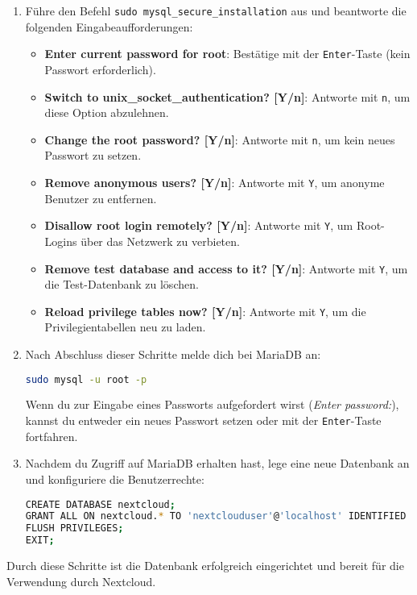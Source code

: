\documentclass[a4paper,12pt]{article}
\begin{document}
\begin{enumerate}
    \item Führe den Befehl \texttt{sudo mysql\_secure\_installation} aus und beantworte die folgenden Eingabeaufforderungen:
    \begin{itemize}
        \item \textbf{Enter current password for root}: Bestätige mit der \texttt{Enter}-Taste (kein Passwort erforderlich).
        \item \textbf{Switch to unix\_socket\_authentication? [Y/n]}: Antworte mit \texttt{n}, um diese Option abzulehnen.
        \item \textbf{Change the root password? [Y/n]}: Antworte mit \texttt{n}, um kein neues Passwort zu setzen.
        \item \textbf{Remove anonymous users? [Y/n]}: Antworte mit \texttt{Y}, um anonyme Benutzer zu entfernen.
        \item \textbf{Disallow root login remotely? [Y/n]}: Antworte mit \texttt{Y}, um Root-Logins über das Netzwerk zu verbieten.
        \item \textbf{Remove test database and access to it? [Y/n]}: Antworte mit \texttt{Y}, um die Test-Datenbank zu löschen.
        \item \textbf{Reload privilege tables now? [Y/n]}: Antworte mit \texttt{Y}, um die Privilegientabellen neu zu laden.
    \end{itemize}
    
    \item Nach Abschluss dieser Schritte melde dich bei MariaDB an:
\begin{lstlisting}[language=bash]
sudo mysql -u root -p
\end{lstlisting}
    Wenn du zur Eingabe eines Passworts aufgefordert wirst (\textit{Enter password:}), kannst du entweder ein neues Passwort setzen oder mit der \texttt{Enter}-Taste fortfahren.
    
    \item Nachdem du Zugriff auf MariaDB erhalten hast, lege eine neue Datenbank an und konfiguriere die Benutzerrechte:
\begin{lstlisting}[language=bash]
CREATE DATABASE nextcloud;
GRANT ALL ON nextcloud.* TO 'nextclouduser'@'localhost' IDENTIFIED BY 'deinPasswort';
FLUSH PRIVILEGES;
EXIT;
\end{lstlisting}
\end{enumerate}

Durch diese Schritte ist die Datenbank erfolgreich eingerichtet und bereit für die Verwendung durch Nextcloud.
\end{document}
